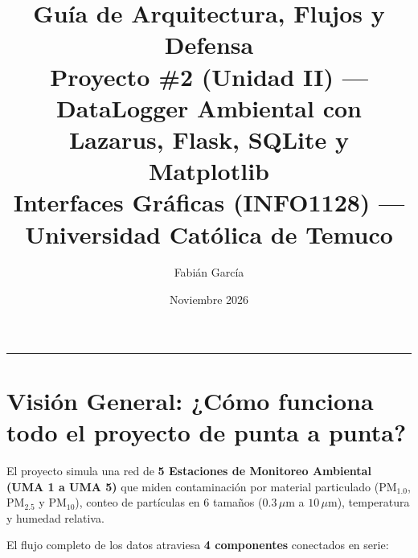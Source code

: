 \documentclass[11pt,a4paper]{article}
\title{\textbf{\textcolor{azuluct}{Guía de Arquitectura, Flujos y Defensa}}\\
\Large Proyecto \#2 (Unidad II) --- DataLogger Ambiental con Lazarus, Flask, SQLite y Matplotlib\\
\normalsize Interfaces Gráficas (INFO1128) --- Universidad Católica de Temuco}
\author{Fabián García}
\date{Noviembre 2026}
\begin{document}
\maketitle
\tableofcontents
\vspace{1em}
\hrule
\vspace{1em}

\section{Visión General: ¿Cómo funciona todo el proyecto de punta a punta?}

El proyecto simula una red de \textbf{5 Estaciones de Monitoreo Ambiental (UMA 1 a UMA 5)} que miden contaminación por material particulado ($\text{PM}_{1.0}$, $\text{PM}_{2.5}$ y $\text{PM}_{10}$), conteo de partículas en 6 tamaños ($0.3\,\mu\text{m}$ a $10\,\mu\text{m}$), temperatura y humedad relativa.

El flujo completo de los datos atraviesa \textbf{4 componentes} conectados en serie:
\end{document}

